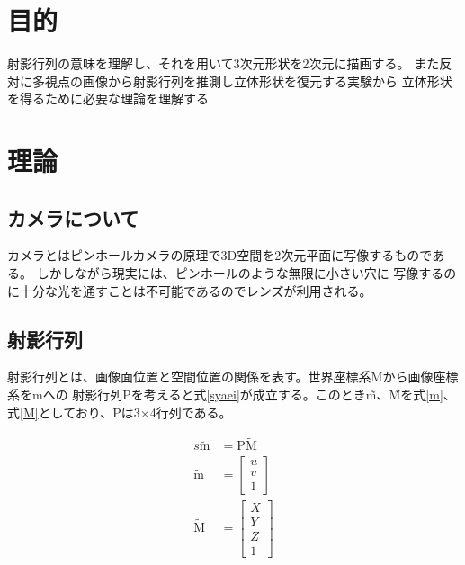 \documentclass[11pt,a4j]{jsarticle}
\begin{document}


\section{目的}
射影行列の意味を理解し、それを用いて3次元形状を2次元に描画する。
また反対に多視点の画像から射影行列を推測し立体形状を復元する実験から
立体形状を得るために必要な理論を理解する


\section{理論}
\label{sec:理論}


\subsection{カメラについて}
\label{sub:カメラについて}
カメラとはピンホールカメラの原理で3D空間を2次元平面に写像するものである。
しかしながら現実には、ピンホールのような無限に小さい穴に
写像するのに十分な光を通すことは不可能であるのでレンズが利用される。


\subsection{射影行列}
\label{sub:射影行列}
射影行列とは、画像面位置と空間位置の関係を表す。世界座標系Mから画像座標系をmへの
射影行列Pを考えると式\ref{syaei}が成立する。このとき\~m、\~Mを式\ref{m}、式\ref{M}としており、Pは3×4行列である。

\begin{align}
  s\mathrm{\tilde{m}} &= \mathrm{P\tilde{M}} \label{syaei} \\[0.3cm]
  \mathrm{\tilde{m}} &= \left[
    \begin{array}{c}
      u \\ v \\ 1
    \end{array}
  \right] \label{m} \\[0.3cm]
  \mathrm{\tilde{M}} &= \left[
    \begin{array}{c}
      X \\ Y \\ Z \\ 1
    \end{array}
  \right] \label{M}
\end{align}
\end{document}
